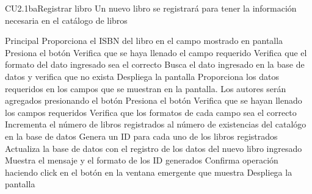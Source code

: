 \begin{UseCase}{CU2.1ba}{Registrar libro}{
	Un nuevo libro se registrará para tener la información necesaria en el catálogo de libros
}
{\begin{itemize}
			\end{itemize}			
		}
\end{UseCase}


\begin{UCtrayectoria}{Principal}
		\UCpaso[\UCactor] Proporciona el ISBN del libro en el campo mostrado en pantalla 
		\UCpaso[\UCactor] Presiona el botón  
		\UCpaso[\UCsist] Verifica que se haya llenado el campo requerido 
		\UCpaso[\UCsist] Verifica que el formato del dato ingresado sea el correcto 
		\UCpaso[\UCsist] Busca el dato ingresado en la base de datos  y verifica que no exista 
		\UCpaso[\UCsist] Despliega la pantalla 
		\UCpaso[\UCactor] Proporciona los datos requeridos en los campos que se muestran en la pantalla. Los autores serán agregados presionando el botón 
		\UCpaso[\UCactor] Presiona el botón  
		\UCpaso[\UCsist] Verifica que se hayan llenado los campos requeridos 
		\UCpaso[\UCsist] Verifica que los formatos de cada campo sea el correcto 
		\UCpaso[\UCsist] Incrementa el número de libros registrados al número de existencias del catalógo en la base de datos
		\UCpaso[\UCsist] Genera un ID para cada uno de los libros registrados
		\UCpaso[\UCsist] Actualiza la base de datos con el registro de los datos del nuevo libro ingresado
		\UCpaso[\UCsist] Muestra el mensaje  y el formato de los ID generados
		\UCpaso[\UCactor] Confirma operación haciendo click en el botón  en la ventana emergente que muestra
		\UCpaso[\UCsist] Despliega la pantalla 
\end{UCtrayectoria}


